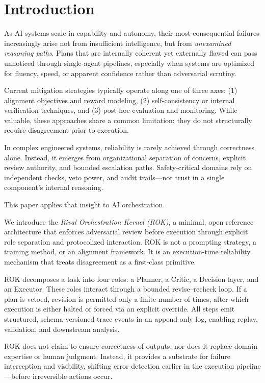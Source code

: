 \section{Introduction}

As AI systems scale in capability and autonomy, their most consequential failures increasingly arise not from insufficient intelligence, but from \emph{unexamined reasoning paths}. Plans that are internally coherent yet externally flawed can pass unnoticed through single-agent pipelines, especially when systems are optimized for fluency, speed, or apparent confidence rather than adversarial scrutiny.

Current mitigation strategies typically operate along one of three axes: (1) alignment objectives and reward modeling, (2) self-consistency or internal verification techniques, and (3) post-hoc evaluation and monitoring. While valuable, these approaches share a common limitation: they do not structurally require disagreement prior to execution.

In complex engineered systems, reliability is rarely achieved through correctness alone. Instead, it emerges from organizational separation of concerns, explicit review authority, and bounded escalation paths. Safety-critical domains rely on independent checks, veto power, and audit trails—not trust in a single component’s internal reasoning.

This paper applies that insight to AI orchestration.

We introduce the \emph{Rival Orchestration Kernel (ROK)}, a minimal, open reference architecture that enforces adversarial review before execution through explicit role separation and protocolized interaction. ROK is not a prompting strategy, a training method, or an alignment framework. It is an execution-time reliability mechanism that treats disagreement as a first-class primitive.

ROK decomposes a task into four roles: a Planner, a Critic, a Decision layer, and an Executor. These roles interact through a bounded revise–recheck loop. If a plan is vetoed, revision is permitted only a finite number of times, after which execution is either halted or forced via an explicit override. All steps emit structured, schema-versioned trace events in an append-only log, enabling replay, validation, and downstream analysis.

ROK does not claim to ensure correctness of outputs, nor does it replace domain expertise or human judgment. Instead, it provides a substrate for failure interception and visibility, shifting error detection earlier in the execution pipeline—before irreversible actions occur.


